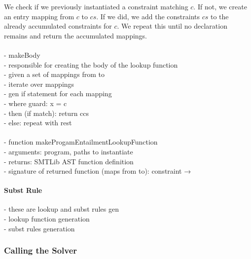 We check if we previously instantiated a constraint matching $c$.
If not, we create an entry mapping from $c$ to $cs$.
If we did, we add the constraints $cs$ to the already
accumulated constraints for $c$.
We repeat this until no declaration remains
and return the accumulated mappings.\\
\\
- makeBody\\
- responsible for creating the body of the lookup function\\
  - given a set of mappings from \Constr to \Constrss\\
  - iterate over mappings\\
  - gen if statement for each mapping \\
    - where guard: x = c\\
    - then (if match): return ccs\\
    - else: repeat with rest\\
\quad\\
- function makeProgamEntailmentLookupFunction\\
  - arguments: program, paths to instantiate\\
  - returns: SMTLib AST function definition\\
- signature of returned function (maps from to): constraint → \Constrs


\paragraph{Subst Rule}

- these are lookup and subst rules gen \\
- lookup function generation\\
- subst rules generation
\subsubsection{Calling the Solver}

